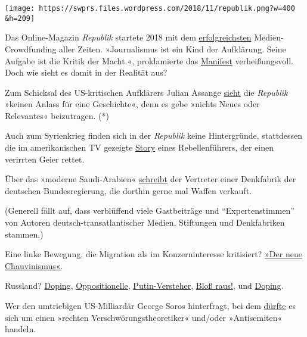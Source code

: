 \texttt{[image: https://swprs.files.wordpress.com/2018/11/republik.png?w=400\\\&h=209]}

Das Online-Magazin \emph{Republik} startete 2018 mit dem
\href{https://www.persoenlich.com/medien/weltrekord-fur-journalistisches-crowdfunding-gebrochen}{erfolgreichsten}
Medien-Crowdfunding aller Zeiten. »Journalismus ist ein Kind der
Aufklärung. Seine Aufgabe ist die Kritik der Macht.«, prokla­mierte das
\href{https://www.republik.ch/manifest}{Manifest} verheißungsvoll. Doch
wie sieht es damit in der Realität aus?

Zum Schicksal des US-kritischen Aufklärers Julian Assange
\href{https://www.republik.ch/2018/04/03/dialog-mit-der-redaktion/diskussion?focus=ac8c6d06-7869-4f5d-a3a4-d79a38faaf1f}{sieht}
die \emph{Republik} »keinen Anlass für eine Geschichte«, denn es gebe
»nichts Neues oder Relevantes« beizutragen. (*)

Auch zum Syrienkrieg finden sich in der \emph{Republik} keine
Hintergründe, stattdessen die im amerikanischen TV gezeigte
\href{https://www.republik.ch/2018/11/02/der-friedensgeier}{Story} eines
Rebellen­führers, der einen verirrten Geier rettet.

Über das »moderne Saudi-Arabien«
\href{https://www.republik.ch/2018/08/31/der-kronprinz-und-der-kalte-krieg}{schreibt}
der Vertreter einer Denkfabrik der deutschen Bundesregierung, die
dorthin gerne mal Waffen verkauft.

(Generell fällt auf, dass verblüffend viele Gastbeiträge und
``Expertenstimmen'' von Autoren deutsch-transatlantischer Medien,
Stiftungen und Denkfabriken stammen.)

Eine linke Bewegung, die Migration als im Konzerninteresse kritisiert?
\href{https://www.republik.ch/2018/08/18/der-neue-chauvinismus}{»Der
neue Chauvinismus«}.

Russland?
\href{https://www.republik.ch/2018/01/29/geheimsache-doping-teil1}{Doping},
\href{https://www.republik.ch/2018/03/12/mit-youtube-und-gelben-quietschenten-gegen-putin}{Oppositionelle},
\href{https://www.republik.ch/2018/03/10/die-ueberlaeufer}{Putin-Versteher},
\href{https://www.republik.ch/2018/05/29/bloss-raus-aus-muetterchen-russland}{Bloß
raus!}, und
\href{https://www.republik.ch/2018/01/29/geheimsache-doping-teil2}{Doping}.

Wer den umtriebigen US-Milliardär George Soros hinterfragt, bei dem
\href{https://www.republik.ch/2018/11/05/welcome-to-switzerland-mr-soros}{dürfte}
es sich um einen »rechten Verschwörungstheoretiker« und/oder
»Antisemiten« handeln.

